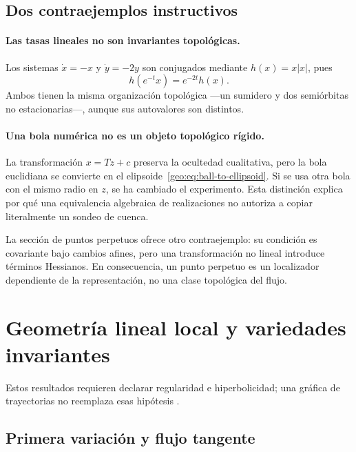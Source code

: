 \subsection{Dos contraejemplos instructivos}

\paragraph{Las tasas lineales no son invariantes topológicas.}
Los sistemas \(\dot x=-x\) y \(\dot y=-2y\) son conjugados mediante
\(h(x)=x|x|\), pues
\[
 h(e^{-t}x)=e^{-2t}h(x).
\]
Ambos tienen la misma organización topológica ---un sumidero y dos
semiórbitas no estacionarias---, aunque sus autovalores son distintos.

\paragraph{Una bola numérica no es un objeto topológico rígido.}
La transformación \(x=Tz+c\) preserva la ocultedad cualitativa, pero la bola
euclidiana se convierte en el elipsoide~\eqref{geo:eq:ball-to-ellipsoid}. Si se
usa otra bola con el mismo radio en \(z\), se ha cambiado el experimento. Esta
distinción explica por qué una equivalencia algebraica de realizaciones no
autoriza a copiar literalmente un sondeo de cuenca.

La sección de puntos perpetuos ofrece otro contraejemplo: su condición es
covariante bajo cambios afines, pero una transformación no lineal introduce
términos Hessianos. En consecuencia, un punto perpetuo es un localizador
dependiente de la representación, no una clase topológica del flujo.

\fi
\HAFOGeoRenderBlocktrue
\ifdefined\HAFOGeoBlockSelect
  \HAFOGeoRenderBlockfalse
  \ifdefined\HAFOGeoBlockLinear\HAFOGeoRenderBlocktrue\fi
\fi
\ifHAFOGeoRenderBlock
\HAFOStudyNeedspace
\section{Geometría lineal local y variedades invariantes}
\label{sec:geo-stable-manifolds}

\HAFOCardLinearGeometry

Estos resultados requieren declarar regularidad e
hiperbolicidad; una gráfica de trayectorias no reemplaza esas hipótesis
\cite{JaurezEtAl2021TGEDI,JaurezEtAl2021TGEDII,HirschSmaleDevaney2013}.

\subsection{Primera variación y flujo tangente}

